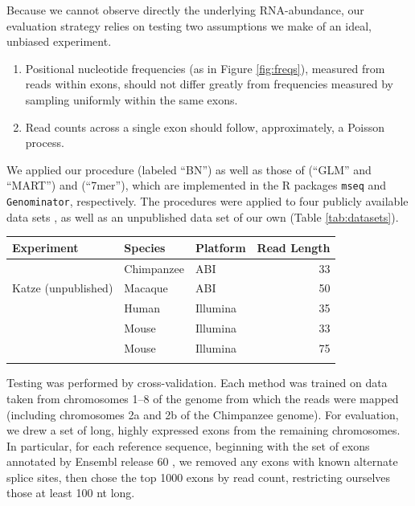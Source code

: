 \documentclass{bioinfo}
\begin{document}
Because we cannot observe directly the underlying RNA-abundance, our evaluation
strategy relies on testing two assumptions we make of an ideal, unbiased experiment.
\begin{enumerate}
\item Positional nucleotide frequencies (as in Figure \ref{fig:freqs}), measured
from reads within exons, should not differ greatly from frequencies measured by
sampling uniformly within the same exons.
\item Read counts across a single exon should follow, approximately, a Poisson
process.
\end{enumerate}

We applied our procedure (labeled ``BN'') as well as those of
\citet{Li2010} (``GLM'' and ``MART'') and \citet{Hansen2010} (``7mer''), which
are implemented in the R packages \texttt{mseq} and \texttt{Genominator},
respectively. The procedures were applied to four publicly available data
sets \citep{Bullard2010, Mortazavi2008, Trapnell2010, Wetterbom2010}, as well as
an unpublished data set of our own (Table \ref{tab:datasets}).

\begin{table}
{
\begin{tabular}{lllr}\toprule
Experiment & Species & Platform & Read Length \\\midrule
\citet{Wetterbom2010} & Chimpanzee & ABI & 33 \\
Katze (unpublished) & Macaque & ABI & 50 \\
\citet{Bullard2010} & Human & Illumina & 35 \\
\citet{Mortazavi2008} & Mouse & Illumina & 33 \\
\citet{Trapnell2010} & Mouse & Illumina & 75 \\\botrule
\end{tabular}
}{}
\end{table}


Testing was performed by cross-validation. Each method was trained on data taken
from chromosomes 1--8 of the genome from which the reads were mapped (including
chromosomes 2a and 2b of the Chimpanzee genome). For evaluation, we drew a set
of long, highly expressed exons from the remaining chromosomes. In particular, for
each reference sequence, beginning with the set of exons annotated by Ensembl
release 60 \cite{Hubbard2009}, we removed any exons with known alternate splice
sites, then chose the top 1000 exons by read count, restricting ourselves those
at least 100 nt long.
\end{document}
